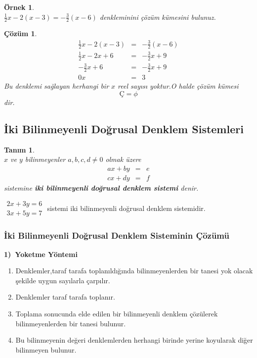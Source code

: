\documentclass[a4paper,10pt]{book}
\theoremstyle{italik}
\newtheorem{ornek}{Örnek}[chapter]
\newtheorem*{cozum}{Çözüm}
\newtheorem*{tanim}{Tanım}
\begin{document}
\begin{ornek}
	\quad\\
	$\frac{1}{2}x-2\left(x-3\right)=-\frac{3}{2}\left(x-6\right)$ denkleminini çözüm kümesini bulunuz.
\end{ornek}
\begin{cozum}
	\begin{eqnarray*}
		\frac{1}{2}x-2\left(x-3\right) &=& -\frac{3}{2}\left(x-6\right) \\
		\frac{1}{2}x-2x+6              &=& -\frac{3}{2}x+9 \\
		-\frac{3}{2}x+6                &=& -\frac{3}{2}x+9 \\
		0x                             &=& 3
	\end{eqnarray*}
	Bu denklemi sağlayan herhangi bir $x$ reel sayısı yoktur.O halde çözüm kümesi $$\text{Ç}=\phi$$ dir.
\end{cozum}

\subsection{İki Bilinmeyenli Doğrusal Denklem Sistemleri}
\begin{tanim}
	\quad\\
	$x$ ve $y$ bilinmeyenler $a,b,c,d\not=0$ olmak üzere
	\begin{eqnarray*}
		ax+by &=& e \\
		cx+dy &=& f
	\end{eqnarray*}
	sistemine \textsl{\textbf{iki bilinmeyenli doğrusal denklem sistemi}} denir.\\
\end{tanim}


	$
	\begin{aligned}
		2x+3y=6 \\
		3x+5y=7
	\end{aligned}
	$ \quad sistemi iki bilinmeyenli doğrusal denklem sistemidir.


\subsubsection{İki Bilinmeyenli Doğrusal Denklem Sisteminin Çözümü}
\textbf{1)\ Yoketme Yöntemi}
\renewcommand{\theenumi}{\roman{enumi}}
\begin{enumerate}
		\item					
			Denklemler,taraf tarafa toplanıldığında bilinmeyenlerden bir tanesi yok olacak şekilde
			uygun sayılarla çarpılır.
		\item
			Denklemler taraf tarafa toplanır.
		\item
			Toplama sonucunda elde edilen bir bilinmeyenli denklem çözülerek bilinmeyenlerden bir tanesi
			bulunur.
		\item
			Bu bilinmeyenin değeri denklemlerden herhangi birinde yerine koyularak diğer bilinmeyen
			bulunur.
\end{enumerate}
\end{document}
